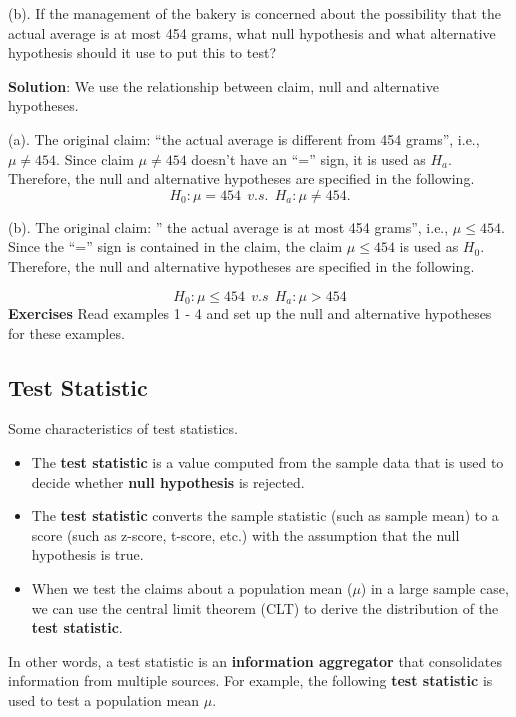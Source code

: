 \documentclass[
]{book}
\begin{document}
(b). If the management of the bakery is concerned about the possibility that the actual average is at most 454 grams, what null hypothesis and what alternative hypothesis should it use to put this to test?

\textbf{Solution}: We use the relationship between claim, null and alternative hypotheses.

(a). The original claim: ``the actual average is different from 454 grams'', i.e., \(\mu \ne 454\). Since claim \(\mu \ne 454\) doesn't have an ``='' sign, it is used as \(H_a\). Therefore, the null and alternative hypotheses are specified in the following.
\[ H_0: \mu = 454  \ \ v.s. \ \ H_a: \mu \ne 454.\]

(b). The original claim: '' the actual average is at most 454 grams'', i.e., \(\mu \le 454\). Since the ``='' sign is contained in the claim, the claim \(\mu \le 454\) is used as \(H_0\). Therefore, the null and alternative hypotheses are specified in the following.

\[H_0:   \mu \le 454   \ \   v.s  \ \  H_a:  \mu >  454\]
\textbf{Exercises} Read examples 1 - 4 and set up the null and alternative hypotheses for these examples.

\hfill\break

\hypertarget{test-statistic}{%
\subsection{Test Statistic}\label{test-statistic}}

Some characteristics of test statistics.

\begin{itemize}
\item
  The \textbf{test statistic} is a value computed from the sample data that is used to decide whether \textbf{null hypothesis} is rejected.
\item
  The \textbf{test statistic} converts the sample statistic (such as sample mean) to a score (such as z-score, t-score, etc.) with the assumption that the null hypothesis is true.
\item
  When we test the claims about a population mean (\(\mu\)) in a large sample case, we can use the central limit theorem (CLT) to derive the distribution of the \textbf{test statistic}.
\end{itemize}

In other words, a test statistic is an \textbf{information aggregator} that consolidates information from multiple sources. For example, the following \textbf{test statistic} is used to test a population mean \(\mu\).
\end{document}
